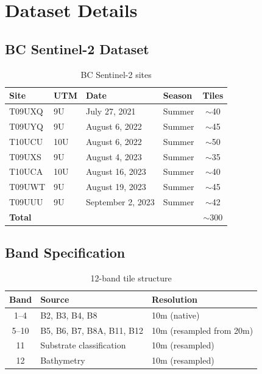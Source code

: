\documentclass[11pt,a4paper]{article}
\begin{document}
\section{Dataset Details}
\label{app:datasets}

\subsection{BC Sentinel-2 Dataset}

\begin{table}[h]
\centering
\caption{BC Sentinel-2 sites}
\begin{tabular}{llllc}
\toprule
\textbf{Site} & \textbf{UTM} & \textbf{Date} & \textbf{Season} & \textbf{Tiles} \\
\midrule
T09UXQ & 9U & July 27, 2021 & Summer & $\sim$40 \\
T09UYQ & 9U & August 6, 2022 & Summer & $\sim$45 \\
T10UCU & 10U & August 6, 2022 & Summer & $\sim$50 \\
T09UXS & 9U & August 4, 2023 & Summer & $\sim$35 \\
T10UCA & 10U & August 16, 2023 & Summer & $\sim$40 \\
T09UWT & 9U & August 19, 2023 & Summer & $\sim$45 \\
T09UUU & 9U & September 2, 2023 & Summer & $\sim$42 \\
\midrule
\multicolumn{4}{l}{\textbf{Total}} & $\sim$300 \\
\bottomrule
\end{tabular}
\end{table}

\subsection{Band Specification}

\begin{table}[h]
\centering
\caption{12-band tile structure}
\begin{tabular}{cll}
\toprule
\textbf{Band} & \textbf{Source} & \textbf{Resolution} \\
\midrule
1--4 & B2, B3, B4, B8 & 10m (native) \\
5--10 & B5, B6, B7, B8A, B11, B12 & 10m (resampled from 20m) \\
11 & Substrate classification & 10m (resampled) \\
12 & Bathymetry & 10m (resampled) \\
\bottomrule
\end{tabular}
\end{table}
\end{document}
